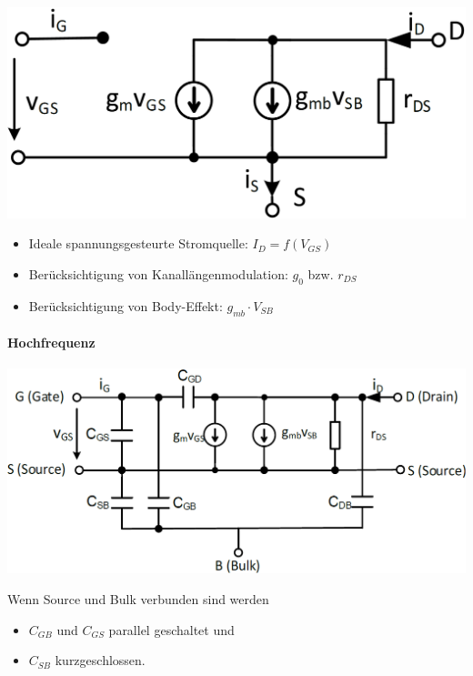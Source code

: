 \begin{minipage}[t]{0.48\columnwidth}
    \includegraphics[width=\columnwidth, align=t]{images/02_MOSFET_Pi_Ersatzschaltung_angepasste_Stromrichtung.png}
\end{minipage}
\hfill
\begin{minipage}[t]{0.48\columnwidth}
    \raggedright
    \begin{itemize}
        \item Ideale spannungsgesteurte Stromquelle: $I_D = f(V_{GS})$
        \item Berücksichtigung von Kanallängenmodulation: $g_0$ bzw. $r_{DS}$
        \item Berücksichtigung von Body-Effekt: $g_{mb} \cdot V_{SB}$
    \end{itemize}
\end{minipage}


\paragraph{Hochfrequenz}
\label{Hochfrequenz}

\begin{minipage}[t]{0.48\columnwidth}
    \includegraphics[width=\columnwidth, align=t]{images/02_MOSFET_Kleinsignalersatzschaltung_hochfrequent_angepasste_Stromrichtung.png}
\end{minipage}
\hfill
\begin{minipage}[t]{0.48\columnwidth}
    \raggedright
    Wenn Source und Bulk verbunden sind werden
    \begin{itemize}
        \item $C_{GB}$ und $C_{GS}$ parallel geschaltet und
        \item $C_{SB}$ kurzgeschlossen.
    \end{itemize}
\end{minipage}


